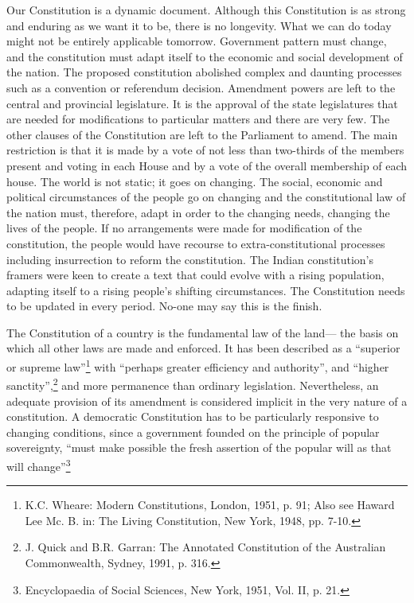 \setcounter{figure}{0}
\setcounter{table}{0}


\begin{multicols}{2}


\noi
Our Constitution is a dynamic document. Although this Constitution is as strong and enduring
as we want it to be, there is no longevity. What we can do today might not be entirely
applicable tomorrow. Government pattern must change, and the constitution must adapt itself
to the economic and social development of the nation. The proposed constitution abolished
complex and daunting processes such as a convention or referendum decision. Amendment
powers are left to the central and provincial legislature. It is the approval of the state
legislatures that are needed for modifications to particular matters and there are very few. The
other clauses of the Constitution are left to the Parliament to amend. The main restriction is
that it is made by a vote of not less than two-thirds of the members present and voting in each
House and by a vote of the overall membership of each house. The world is not static; it goes
on changing. The social, economic and political circumstances of the people go on changing
and the constitutional law of the nation must, therefore, adapt in order to the changing needs,
changing the lives of the people. If no arrangements were made for modification of the
constitution, the people would have recourse to extra-constitutional processes including
insurrection to reform the constitution. The Indian constitution’s framers were keen to create
a text that could evolve with a rising population, adapting itself to a rising people’s shifting
circumstances. The Constitution needs to be updated in every period. No-one may say this is
the finish.


\noi
The Constitution of a country is the fundamental law of the land— the basis on which all other
laws are made and enforced. It has been described as a “superior or supreme law”\footnote{K.C. Wheare: Modern Constitutions, London, 1951, p. 91; Also see Haward Lee Mc. B. in: The Living Constitution, New York, 1948, pp. 7-10.}
 with “perhaps greater efficiency and authority”, and “higher sanctity”,\footnote{J. Quick and B.R. Garran: The Annotated Constitution of the Australian Commonwealth, Sydney, 1991, p. 316.} and more permanence than
ordinary legislation. Nevertheless, an adequate provision of its amendment is considered
implicit in the very nature of a constitution. A democratic Constitution has to be particularly
responsive to changing conditions, since a government founded on the principle of popular
sovereignty, “must make possible the fresh assertion of the popular will as that will change”\footnote{Encyclopaedia of Social Sciences, New York, 1951, Vol. II, p. 21.}


\end{multicols}
